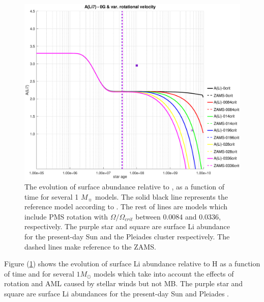 \documentclass[fleqn,usenatbib]{mnras}
\begin{document}
\begin{figure}
	\includegraphics[trim = 35mm 15mm 20mm 15mm, clip, width=\columnwidth]{figures/li_var_vel_0_0g.eps}
    \caption{The evolution of surface  abundance relative to , as a function of time for several 1 $M_{\sun}$ models. The solid black line represents the reference model according to \citet{Choi2016}. The rest of lines are models which include PMS rotation with $\Omega / \Omega_{crit}$ between 0.0084 and 0.0336, respectively. The purple star and square are surface Li abundance for the present-day Sun \citep{Asplund2009} and the Pleiades cluster \citep{Sestito2005} respectively. The dashed lines make reference to the ZAMS.}
    \label{fig:li_var_vel_0g}
\end{figure}

Figure (\ref{fig:li_var_vel_0g}) shows the evolution of surface Li abundance relative to H as a function of time and for several $1M_{\odot}$ models which take into account the effects of rotation and AML caused by stellar winds but not MB. The purple star and square are surface Li abundances for the present-day Sun \citep{Asplund2009} and Pleiades \citep{Sestito2005}.\par
\end{document}

